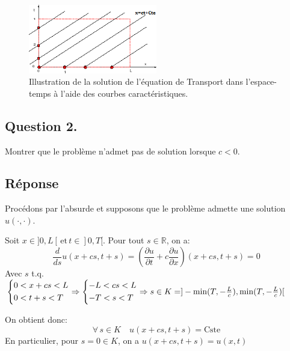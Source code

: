 \documentclass[
	french,
	11pt, %
]{fphw}
\begin{document}
\begin{figure}[h]
	\centering
	\includegraphics[width=0.5\textwidth]{Transport1}
	\captionsetup{justification=centering}
	\caption{Illustration de la solution de l'équation de Transport dans l'espace-temps à l'aide des courbes caractéristiques.}
\end{figure}


\subsection*{Question 2.}
\begin{problem}
	Montrer que le problème n'admet pas de solution lorsque $c < 0$.
\end{problem}

\subsection*{Réponse} 

Procédons par l'absurde et supposons que le problème admette une solution $u(\cdot,\cdot)$.

\noindent Soit $x \in ]0, L[\, \text{et} \, t \in ]0, T[$. Pour tout $s \in \mathbb{R}$, on a: 
$$
\frac{d}{ds} u(x+cs, t+s) = \left( \frac{\partial u}{\partial t} + c \frac{\partial u}{\partial x}\right)(x+cs, t+s)=0 
$$
Avec $s$ t.q.
$
\begin{dcases}
	0 < x+cs < L \\
	0 < t+s < T
\end{dcases}  
\Rightarrow 
\begin{dcases}
	-L < cs < L \\
	-T < s < T
\end{dcases}  
\Rightarrow 
s \in K = ]-\min(T, -\frac{L}{c}), \min(T, -\frac{L}{c})[
$

\noindent On obtient donc: 
\begin{equation}
	\forall \, s \in K \quad u(x+cs, t+s) = \text{Cste} 
	\label{uCste}
\end{equation}
En particulier, pour $s=0 \in K$, on a $u(x+cs, t+s) = u(x, t)$ 
\end{document}
